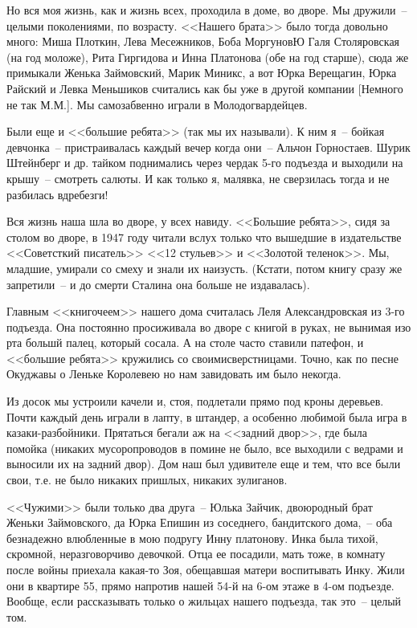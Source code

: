 Но вся моя жизнь, как и жизнь всех, проходила в доме, во дворе. Мы дружили~-- целыми поколениями, по возрасту. <<Нашего брата>> было тогда довольно много: Миша Плоткин, Лева Месежников, Боба МоргуновЮ Галя Столяровская (на год моложе), Рита Гиргидова и Инна Платонова (обе на год старше), сюда же примыкали Женька Займовский, Марик Миникс, а вот Юрка Верещагин, Юрка Райский и Левка Меньшиков считались как бы уже в другой компании [Немного не так М.М.].  Мы самозабвенно играли в Молодогвардейцев.

Были еще и <<большие ребята>> (так мы их называли). К ним я~-- бойкая девчонка~-- пристраивалась каждый вечер когда они~-- Альчон Горностаев. Шурик Штейнберг и др. тайком поднимались через чердак 5-го подъезда и выходили на крышу~-- смотреть салюты. И как только я, малявка, не сверзилась тогда и не разбилась вдребезги!

Вся жизнь наша шла во дворе, у всех навиду. <<Большие ребята>>, сидя за столом во дворе, в 1947 году читали вслух только что вышедшие в издательстве <<Советсткий писатель>> <<12 стульев>> и <<Золотой теленок>>. Мы, младшие, умирали со смеху и знали их наизусть. (Кстати, потом книгу сразу же запретили~-- и до смерти Сталина она больше не издавалась).

Главным <<книгочеем>> нашего дома считалась Леля Александровская из 3-го подъезда. Она постоянно просиживала во дворе с книгой в руках, не вынимая изо рта большй палец, который сосала. А на столе часто ставили патефон, и <<большие ребята>> кружились со своимисверстницами. Точно, как по песне Окуджавы о Леньке Королевею но нам завидовать им было некогда.

Из досок мы устроили качели и, стоя, подлетали прямо под кроны деревьев. Почти каждый день играли в лапту, в штандер, а особенно любимой была игра в казаки-разбойники. Прятаться бегали аж на <<задний двор>>, где была помойка (никаких мусоропроводов в помине не было, все выходили с ведрами и выносили их на задний двор). Дом наш был удивителе еще и тем, что все были свои, т.е. не было никаких пришлых, никаких зулиганов.

<<Чужими>> были только два друга~-- Юлька Зайчик, двоюродный брат Женьки Займовского, да Юрка Епишин из соседнего, бандитского дома,~-- оба безнадежно влюбленные в мою подругу Инну платонову. Инка была тихой, скромной, неразговорчиво девочкой. Отца ее посадили, мать тоже, в комнату после войны приехала какая-то Зоя, обещавшая матери воспитывать Инку. Жили они в квартире 55, прямо напротив нашей 54-й на 6-ом этаже в 4-ом подъезде. Вообще, если рассказывать только о жильцах нашего подъезда, так это~-- целый том.

